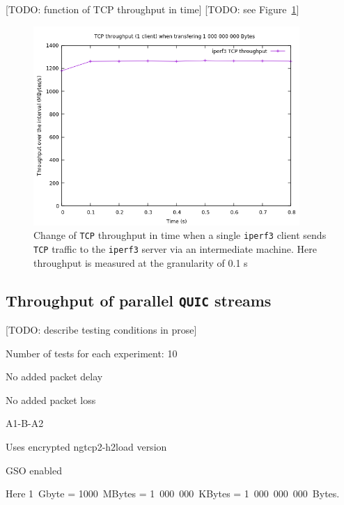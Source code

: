 \documentclass[12pt,a4paper,twoside,openright]{report}
\begin{document}
[TODO: function of TCP throughput in time]
[TODO: see Figure~\ref{fig:TCP_throughput_in_time}]
    \begin{figure}[H]
    \centering
    \includegraphics[width=0.9\textwidth]{figs/TCP_throughput_in_time.png}
    \caption[Change of \texttt{TCP} throughput in time when a single \texttt{iperf3} client sends \texttt{TCP} traffic to the \texttt{iperf3} server via an intermediate machine]{Change of \texttt{TCP} throughput in time when a single \texttt{iperf3} client sends \texttt{TCP} traffic to the \texttt{iperf3} server via an intermediate machine. Here throughput is measured at the granularity of 0.1 s}
    \label{fig:TCP_throughput_in_time}
    \end{figure}
    
    
    

\subsection{Throughput of parallel \texttt{QUIC} streams}
[TODO: describe testing conditions in prose]

Number of tests for each experiment: 10

No added packet delay

No added packet loss

A1-B-A2

Uses encrypted ngtcp2-h2load version

GSO enabled


Here 1~Gbyte = 1000~MBytes = 1~000~000~KBytes = 1~000~000~000~Bytes.
\end{document}

